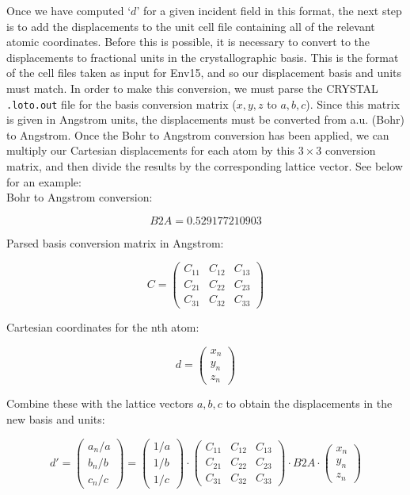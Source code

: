 \documentclass[10pt]{article}
\begin{document}
Once we have computed `$d$' for a given incident field in this format, the next step is to add the displacements to the unit cell file containing all of the relevant atomic coordinates. Before this is possible, it is necessary to convert to the displacements to fractional units in the crystallographic basis. This is the format of the cell files taken as input for Env15, and so our displacement basis and units must match. In order to make this conversion, we must parse the CRYSTAL \texttt{.loto.out} file for the basis conversion matrix ($x, y, z$ to $a, b , c$). Since this matrix is given in Angstrom units, the displacements must be converted from a.u. (Bohr) to Angstrom. Once the Bohr to Angstrom conversion has been applied, we can multiply our Cartesian displacements for each atom by this $3\times 3$ conversion matrix, and then divide the results by the corresponding lattice vector. See below for an example:
\\

Bohr to Angstrom conversion:

$$
	B2A = 0.529177210903
$$

Parsed basis conversion matrix in Angstrom:

$$
C = \begin{pmatrix}
C_{11} & C_{12} & C_{13} \\
C_{21} & C_{22} & C_{23} \\
C_{31} & C_{32} & C_{33}
\end{pmatrix}
$$

Cartesian coordinates for the nth atom:

$$d = \begin{pmatrix}
x_n \\
y_n \\
z_n
\end{pmatrix}$$

Combine these with the lattice vectors $a,b,c$ to obtain the displacements in the new basis and units:

$$d' = \begin{pmatrix}
a_n/a \\
b_n/b \\
c_n/c
\end{pmatrix} =
\begin{pmatrix}
1/a \\
1/b \\
1/c
\end{pmatrix}\cdot
\begin{pmatrix}
C_{11} & C_{12} & C_{13} \\
C_{21} & C_{22} & C_{23} \\
C_{31} & C_{32} & C_{33}
\end{pmatrix} \cdot
B2A \cdot
\begin{pmatrix}
x_n \\
y_n \\
z_n
\end{pmatrix}$$
\end{document}
